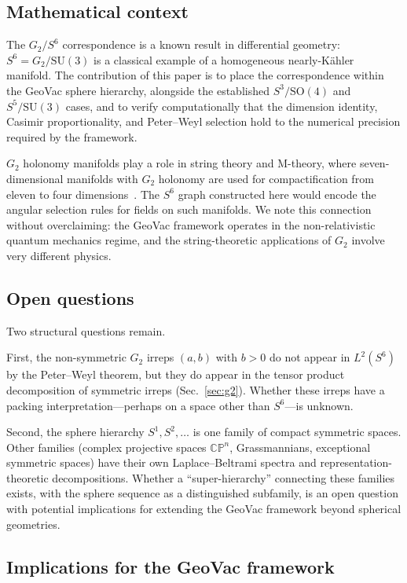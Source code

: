\documentclass[twocolumn,pra,amsmath,amssymb,superscriptaddress]{revtex4-2}
\begin{document}
\subsection{Mathematical context}

The $G_2/S^6$ correspondence is a known result in differential
geometry: $S^6 = G_2/\mathrm{SU}(3)$ is a classical example of a
homogeneous nearly-K\"ahler manifold.  The contribution of this
paper is to place the correspondence within the GeoVac sphere
hierarchy, alongside the established $S^3/\mathrm{SO}(4)$ and
$S^5/\mathrm{SU}(3)$ cases, and to verify computationally that
the dimension identity, Casimir proportionality, and Peter--Weyl
selection hold to the numerical precision required by the framework.

$G_2$ holonomy manifolds play a role in string theory and
M-theory, where seven-dimensional manifolds with $G_2$ holonomy
are used for compactification from eleven to four
dimensions~\cite{Joyce2000}.  The $S^6$ graph constructed here
would encode the angular selection rules for fields on such
manifolds.  We note this connection without overclaiming: the
GeoVac framework operates in the non-relativistic quantum
mechanics regime, and the string-theoretic applications of $G_2$
involve very different physics.

\subsection{Open questions}

Two structural questions remain.

First, the non-symmetric $G_2$ irreps $(a,b)$ with $b > 0$ do not
appear in $L^2(S^6)$ by the Peter--Weyl theorem, but they do
appear in the tensor product decomposition of symmetric irreps
(Sec.~\ref{sec:g2}).  Whether these irreps have a packing
interpretation---perhaps on a space other than $S^6$---is unknown.

Second, the sphere hierarchy $S^1, S^2, \ldots$ is one family of
compact symmetric spaces.  Other families (complex projective
spaces $\mathbb{CP}^n$, Grassmannians, exceptional symmetric
spaces) have their own Laplace--Beltrami spectra and
representation-theoretic decompositions.  Whether a ``super-hierarchy''
connecting these families exists, with the sphere sequence as a
distinguished subfamily, is an open question with potential
implications for extending the GeoVac framework beyond spherical
geometries.

\subsection{Implications for the GeoVac framework}
\end{document}
